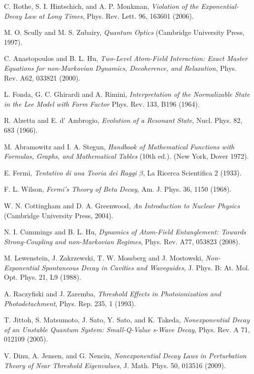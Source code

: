 \documentclass[12pt]{article}
\numberwithin{equation}{section}
\begin{document}
\begin{thebibliography}{}
 C. Rothe, S. I. Hintschich, and A. P. Monkman, {\em Violation of the Exponential-Decay Law at Long Times}, Phys. Rev. Lett.  96, 163601 (2006).





 M. O. Scully and M. S. Zubairy, {\em Quantum Optics} (Cambridge University Press, 1997).

 C. Anastopoulos and B. L. Hu, {\em Two-Level Atom-Field Interaction: Exact Master Equations for non-Markovian Dynamics, Decoherence, and Relaxation}, Phys. Rev. A62, 033821 (2000).

  L. Fonda, G. C. Ghirardi and A. Rimini, {\em Interpretation of the Normalizable State in the Lee Model with Form Factor} Phys. Rev. 133, B196 (1964).


 R. Alzetta and E. d' Ambrogio, {\em
	Evolution of a Resonant State}, Nucl. Phys. 82, 683 (1966).


M. Abramowitz and I. A. Stegun,   {\em Handbook of Mathematical Functions with Formulas, Graphs, and Mathematical Tables} (10th ed.). (New York, Dover 1972).

 E. Fermi,  {\em Tentativo di una Teoria dei Raggi $\beta$}, La Ricerca Scientifica 2 (1933).

 F. L. Wilson, {\em Fermi's Theory of Beta Decay}, Am. J. Phys. 36, 1150 (1968).

 W. N. Cottingham and D. A. Greenwood, {\em An Introduction to Nuclear Physics} (Cambridge University Press, 2004).

   N. I. Cummings and B. L. Hu, {\em
Dynamics of Atom-Field Entanglement: Towards Strong-Coupling and non-Markovian Regimes}, Phys. Rev. A77, 053823 (2008).

  M. Lewenstein, J. Zakrzewski, T. W. Mossberg and J. Mostowski, {\em Non-Exponential Spontaneous Decay in Cavities and Waveguides},  
J.  Phys. B: At. Mol. Opt. Phys. 21, L9 (1988). 
 
  A. Raczyfiski and J. Zaremba, {\em Threshold Effects in
Photoionization and Photodetachment}, Phys. Rep. 235, 1
(1993). 

 T. Jittoh, S. Matsumoto, J. Sato, Y. Sato, and K. Takeda, {\em Nonexponential Decay of an Unstable Quantum System: Small-Q-Value s-Wave Decay}, Phys. Rev. A 71, 012109 (2005).
  
 V. Dinu, A. Jensen, and G. Nenciu, {\em Nonexponential Decay Laws in Perturbation Theory of Near Threshold Eigenvalues}, J. Math. Phys. 50, 013516 (2009).


\end{thebibliography}
\end{document}
